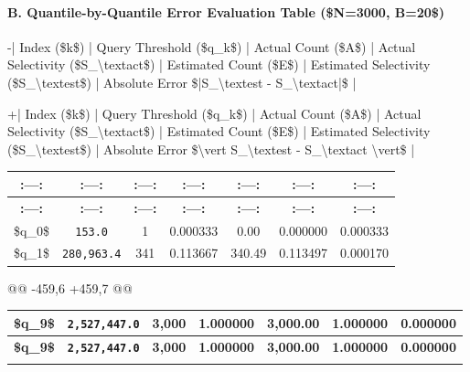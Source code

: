 \documentclass[11pt,a4paper]{article}
\begin{document}
\paragraph{B. Quantile-by-Quantile Error Evaluation Table (\$N=3000, B=20\$)}
-| Index (\$k\$) | Query Threshold (\$q\_k\$) | Actual Count (\$A\$) | Actual Selectivity (\$S\_{\textbackslash{}text{act}}\$) | Estimated Count (\$E\$) | Estimated Selectivity (\$S\_{\textbackslash{}text{est}}\$) | Absolute Error \$|S\_{\textbackslash{}text{est}} - S\_{\textbackslash{}text{act}}|\$ |

+| Index (\$k\$) | Query Threshold (\$q\_k\$) | Actual Count (\$A\$) | Actual Selectivity (\$S\_{\textbackslash{}text{act}}\$) | Estimated Count (\$E\$) | Estimated Selectivity (\$S\_{\textbackslash{}text{est}}\$) | Absolute Error \$\textbackslash{}vert S\_{\textbackslash{}text{est}} - S\_{\textbackslash{}text{act}} \textbackslash{}vert\$ |

{\begingroup
\footnotesize
\setlength{\tabcolsep}{3.5pt}
\begin{xltabular}{\textwidth}{C | C | C | C | C | C | C}
\toprule
\textbf{:---:} & \textbf{:---:} & \textbf{:---:} & \textbf{:---:} & \textbf{:---:} & \textbf{:---:} & \textbf{:---:} \\
\midrule
\endfirsthead
\toprule
\textbf{:---:} & \textbf{:---:} & \textbf{:---:} & \textbf{:---:} & \textbf{:---:} & \textbf{:---:} & \textbf{:---:} \\
\midrule
\endfirsthead
\endhead
\bottomrule
\endfoot
\bottomrule
\endlastfoot
\$q\_0\$ & \texttt{153.0} & 1 & 0.000333 & 0.00 & 0.000000 & 0.000333 \\
\$q\_1\$ & \texttt{280,963.4} & 341 & 0.113667 & 340.49 & 0.113497 & 0.000170 \\
\end{xltabular}
\endgroup}

@@ -459,6 +459,7 @@

{\begingroup
\footnotesize
\setlength{\tabcolsep}{3.5pt}
\begin{xltabular}{\textwidth}{C | C | C | C | C | C | C}
\toprule
\textbf{\$q\_9\$} & \textbf{\texttt{2,527,447.0}} & \textbf{3,000} & \textbf{1.000000} & \textbf{3,000.00} & \textbf{1.000000} & \textbf{0.000000} \\
\midrule
\endfirsthead
\toprule
\textbf{\$q\_9\$} & \textbf{\texttt{2,527,447.0}} & \textbf{3,000} & \textbf{1.000000} & \textbf{3,000.00} & \textbf{1.000000} & \textbf{0.000000} \\
\midrule
\endfirsthead
\endhead
\bottomrule
\endfoot
\bottomrule
\endlastfoot
\end{xltabular}
\endgroup}
\end{document}

